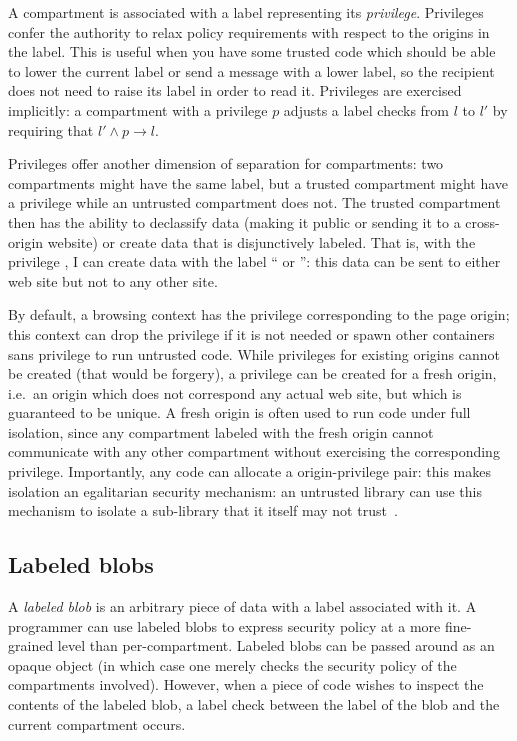 A compartment is associated with a label representing its \emph{privilege}.
%
Privileges confer the authority to relax policy requirements
with respect to the origins in the label.
%
This is useful when you have some trusted code which should be
able to lower the current label or send a message with a lower label, so
the recipient does not need to raise its label in order to read it.
%
Privileges are exercised implicitly: a compartment with a privilege $p$
adjusts a label checks from $l$ to $l'$ by requiring that $l' \land p
\rightarrow l$.

Privileges offer another dimension of separation for compartments: two
compartments might have the same label, but a trusted compartment might
have a privilege while an untrusted compartment does not.
%
The trusted compartment then has the ability to declassify data (making
it public or sending it to a cross-origin website) or create data
that is disjunctively labeled.
%
That is, with the privilege , I can create data with
the label `` or '': this
data can be sent to either web site but not to any other site.

By default, a browsing context has the privilege corresponding to the
page origin; this context can drop the privilege if it is not
needed or spawn other containers sans privilege to run untrusted code.
%
While privileges for existing origins cannot be created (that would be
forgery), a privilege can be created for a fresh origin, i.e.\ an origin
which does not correspond any actual web site, but which is guaranteed
to be unique.
%
A fresh origin is often used to run code under full isolation, since any
compartment labeled with the fresh origin cannot communicate with any
other compartment without exercising the corresponding privilege.
%
Importantly, any code can allocate a origin-privilege pair: this
makes isolation an egalitarian security mechanism: an untrusted library
can use this mechanism to isolate a sub-library that it itself
may not trust~\cite{Zeldovich:2006}.

\subsection{Labeled blobs}
\label{sec:labeled-blobs}

A \emph{labeled blob} is an arbitrary piece of data with a label
associated with it.
%
A programmer can use labeled blobs to express security policy at
a more fine-grained level than per-compartment.
%
Labeled blobs can be passed around as an opaque object (in which case one merely
checks the security policy of the compartments involved).
%
However, when a piece of code wishes to inspect the contents of the
labeled blob, a label check between the label of the blob and the
current compartment occurs.

